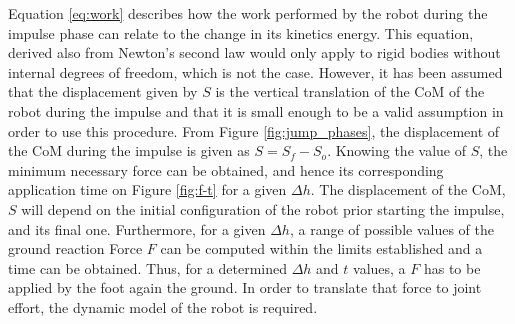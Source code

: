 Equation \ref{eq:work} describes how the work performed by the robot during the impulse phase can relate to the change in its kinetics energy. 
This equation, derived also from Newton's second law would only apply to rigid bodies without internal degrees of freedom, which is not the case.
However, it has been assumed that the displacement given by $S$ is the vertical translation of the CoM of the robot during the impulse and that it is small enough to be a valid assumption in order to use this procedure.
From Figure \ref{fig:jump_phases}, the displacement of the CoM during the impulse is given as $S=S_{f}-S_{o}$.
Knowing the value of $S$, the minimum necessary force can be obtained, and hence its corresponding application time on Figure \ref{fig:f-t} for a given $\Delta h$.
The displacement of the CoM, $S$ will depend on the initial configuration of the robot prior starting the impulse, and its final one.
Furthermore, for a given $\Delta h$, a range of possible values of the ground reaction Force $F$ can be computed within the limits established and a time can be obtained.
Thus, for a determined $\Delta h$ and $t$ values, a $F$ has to be applied by the foot again the ground.
In order to translate that force to joint effort, the dynamic model of the robot is required.


